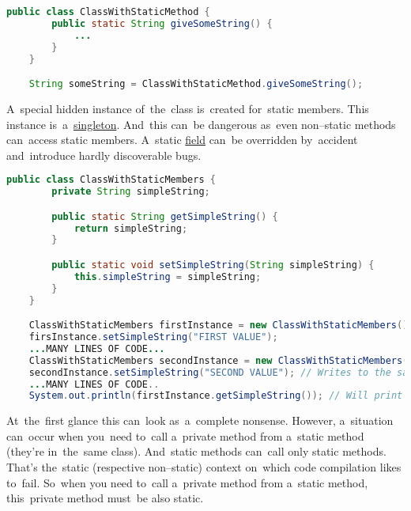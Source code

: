 \begin{lstlisting}[language=Java]
    public class ClassWithStaticMethod {
        public static String giveSomeString() {
            ...
        }
    }

    String someString = ClassWithStaticMethod.giveSomeString();
\end{lstlisting}

\warning A~special hidden instance of~the~class is~created for~static members.
This instance is~a~\hyperref[singletondp]{singleton}.
And~this can~be dangerous as~even non--static methods can~access static members.
A~static \hyperref[variablefieldproperty]{field} can~be overridden by~accident and~introduce hardly discoverable bugs.

\begin{lstlisting}[language=Java]
    public class ClassWithStaticMembers {
        private String simpleString;

        public static String getSimpleString() {
            return simpleString;
        }

        public static void setSimpleString(String simpleString) {
            this.simpleString = simpleString;
        }
    }

    ClassWithStaticMembers firstInstance = new ClassWithStaticMembers();
    firsInstance.setSimpleString("FIRST VALUE");
    ...MANY LINES OF CODE...
    ClassWithStaticMembers secondInstance = new ClassWithStaticMembers();
    secondInstance.setSimpleString("SECOND VALUE"); // Writes to the same instance
    ...MANY LINES OF CODE..
    System.out.println(firstInstance.getSimpleString()); // Will print "SECOND VALUE"
\end{lstlisting}

\label{javafinal}

\label{javasynchronized}

\label{noaccessmodifier}

\label{javaprivatestaticmethods}
At~the~first glance this can~look as~a~complete nonsense.
However, a~situation can~occur when you~need to~call a~private method from a~static method (they're in~the~same class).
And~static methods can~call only static methods.
That's the~static (respective non--static) context on~which code compilation likes to~fail.
So~when you need to~call a~private method from a~static method, this~private method must~be also static.

